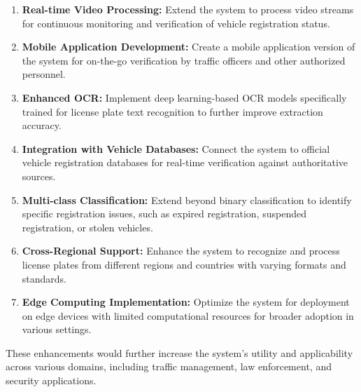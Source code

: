 \documentclass[conference]{IEEEtran}
\begin{document}
\begin{enumerate}
    \item \textbf{Real-time Video Processing:} Extend the system to process video streams for continuous monitoring and verification of vehicle registration status.
    
    \item \textbf{Mobile Application Development:} Create a mobile application version of the system for on-the-go verification by traffic officers and other authorized personnel.
    
    \item \textbf{Enhanced OCR:} Implement deep learning-based OCR models specifically trained for license plate text recognition to further improve extraction accuracy.
    
    \item \textbf{Integration with Vehicle Databases:} Connect the system to official vehicle registration databases for real-time verification against authoritative sources.
    
    \item \textbf{Multi-class Classification:} Extend beyond binary classification to identify specific registration issues, such as expired registration, suspended registration, or stolen vehicles.
    
    \item \textbf{Cross-Regional Support:} Enhance the system to recognize and process license plates from different regions and countries with varying formats and standards.
    
    \item \textbf{Edge Computing Implementation:} Optimize the system for deployment on edge devices with limited computational resources for broader adoption in various settings.
\end{enumerate}

These enhancements would further increase the system's utility and applicability across various domains, including traffic management, law enforcement, and security applications.
\end{document}
